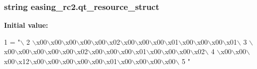 \subsubsection[{qt\+\_\+resource\+\_\+struct}]{\setlength{\rightskip}{0pt plus 5cm}string easing\+\_\+rc2.\+qt\+\_\+resource\+\_\+struct}\label{namespaceeasing__rc2_a839bc498f7d239274a26c4522eb16a1b}
{\bfseries Initial value\+:}
\begin{DoxyCode}
1 = \textcolor{stringliteral}{"\(\backslash\)}
2 \textcolor{stringliteral}{\(\backslash\)x00\(\backslash\)x00\(\backslash\)x00\(\backslash\)x00\(\backslash\)x00\(\backslash\)x02\(\backslash\)x00\(\backslash\)x00\(\backslash\)x00\(\backslash\)x01\(\backslash\)x00\(\backslash\)x00\(\backslash\)x00\(\backslash\)x01\(\backslash\)}
3 \textcolor{stringliteral}{\(\backslash\)x00\(\backslash\)x00\(\backslash\)x00\(\backslash\)x00\(\backslash\)x00\(\backslash\)x02\(\backslash\)x00\(\backslash\)x00\(\backslash\)x00\(\backslash\)x01\(\backslash\)x00\(\backslash\)x00\(\backslash\)x00\(\backslash\)x02\(\backslash\)}
4 \textcolor{stringliteral}{\(\backslash\)x00\(\backslash\)x00\(\backslash\)x00\(\backslash\)x12\(\backslash\)x00\(\backslash\)x00\(\backslash\)x00\(\backslash\)x00\(\backslash\)x00\(\backslash\)x01\(\backslash\)x00\(\backslash\)x00\(\backslash\)x00\(\backslash\)x00\(\backslash\)}
5 \textcolor{stringliteral}{"}
\end{DoxyCode}
